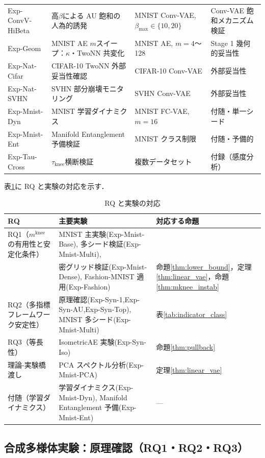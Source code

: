 \documentclass[11pt,a4paper]{jsarticle}
\newcommand{\mknee}{m^{\mathrm{knee}}}
\begin{document}
\begin{table}[H]
\begin{tabular}{llll}
Exp-ConvV-HiBeta & 高$\beta$による AU 飽和の人為的誘発 & MNIST Conv-VAE, $\beta_{\max}\in\{10,20\}$ & Conv-VAE 飽和メカニズム検証 \\
Exp-Geom & MNIST AE $m$スイープ：$\kappa$・TwoNN 共変化 & MNIST AE, $m=4$〜128 & Stage 1 幾何的妥当性 \\
Exp-Nat-Cifar & CIFAR-10 TwoNN 外部妥当性確認 & CIFAR-10 Conv-VAE & 外部妥当性 \\
Exp-Nat-SVHN & SVHN 部分崩壊モニタリング & SVHN Conv-VAE & 外部妥当性 \\
Exp-Mnist-Dyn & MNIST 学習ダイナミクス & MNIST FC-VAE, $m=16$ & 付随・単一シード \\
Exp-Mnist-Ent & Manifold Entanglement 予備検証 & MNIST クラス制限 & 付随・予備的 \\
Exp-Tau-Cross & $\tau_\mathrm{knee}$横断検証 & 複数データセット & 付録（感度分析） \\
\bottomrule
\end{tabular}
\end{table}

表\ref{tab:rq_exp_map}に RQ と実験の対応を示す．

\begin{table}[H]
\centering
\caption{RQ と実験の対応}
\label{tab:rq_exp_map}
\small
\begin{tabular}{lll}
\toprule
RQ & 主要実験 & 対応する命題 \\
\midrule
RQ1（$\mknee$の有用性と安定化条件） & MNIST 主実験(Exp-Mnist-Base), 多シード検証(Exp-Mnist-Multi), & \\
 & 密グリッド検証(Exp-Mnist-Dense), Fashion-MNIST 適用(Exp-Fashion) & 命題\ref{thm:lower_bound}，定理\ref{thm:linear_vae}，命題\ref{thm:mknee_instab} \\
RQ2（多指標フレームワーク安定性） & 原理確認(Exp-Syn-1,Exp-Syn-AU,Exp-Syn-Top), MNIST 多シード(Exp-Mnist-Multi) & 表\ref{tab:indicator_class} \\
RQ3（等長性） & IsometricAE 実験(Exp-Syn-Iso) & 命題\ref{thm:pullback} \\
理論-実験橋渡し & PCA スペクトル分析(Exp-Mnist-PCA) & 定理\ref{thm:linear_vae} \\
付随（学習ダイナミクス） & 学習ダイナミクス(Exp-Mnist-Dyn), Manifold Entanglement 予備(Exp-Mnist-Ent) & --- \\
\bottomrule
\end{tabular}
\end{table}

\subsection{合成多様体実験：原理確認（RQ1・RQ2・RQ3）}\label{sec:exp_synthetic}
\end{document}
